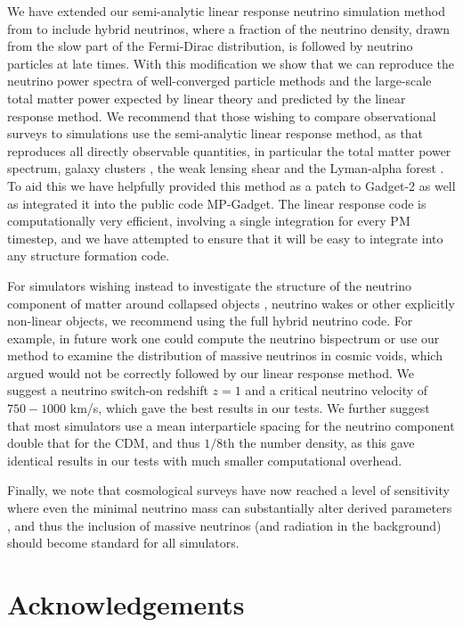 \documentclass[useAMS, usenatbib]{mnras}
\begin{document}
We have extended our semi-analytic linear response neutrino simulation method from \cite{AHB} to include hybrid neutrinos, where a fraction of the neutrino density, drawn from the slow part of the Fermi-Dirac distribution, is followed by neutrino particles at late times. With this modification we show that we can reproduce the neutrino power spectra of well-converged particle methods and the large-scale total matter power expected by linear theory and predicted by the linear response method. We recommend that those wishing to compare observational surveys to simulations use the semi-analytic linear response method, as that reproduces all directly observable quantities, in particular the total matter power spectrum, galaxy clusters \citep{McCarthy_2015}, the weak lensing shear \citep{Liu_2017} and the Lyman-alpha forest \citep{AHB}. To aid this we have helpfully provided this method as a patch to Gadget-2 as well as integrated it into the public code MP-Gadget. The linear response code is computationally very efficient, involving a single integration for every PM timestep, and we have attempted to ensure that it will be easy to integrate into any structure formation code.

For simulators wishing instead to investigate the structure of the neutrino component of matter around collapsed objects \citep{Paco_2013}, neutrino wakes \cite{Inman_2016} or other explicitly non-linear objects, we recommend using the full hybrid neutrino code. For example, in future work one could compute the neutrino bispectrum or use our method to examine the distribution of massive neutrinos in cosmic voids, which \cite{Dalal_2016} argued would not be correctly followed by our linear response method. We suggest a neutrino switch-on redshift $z=1$ and a critical neutrino velocity of $750-1000$ km/s, which gave the best results in our tests. We further suggest that most simulators use a mean interparticle spacing for the neutrino component double that for the CDM, and thus $1/8$th the number density, as this gave identical results in our tests with much smaller computational overhead.

Finally, we note that cosmological surveys have now reached a level of sensitivity where even the minimal neutrino mass can substantially alter derived parameters \cite{Hlozek_??}, and thus the inclusion of massive neutrinos (and radiation in the background) should become standard for all simulators.

\section*{Acknowledgements}
\end{document}
